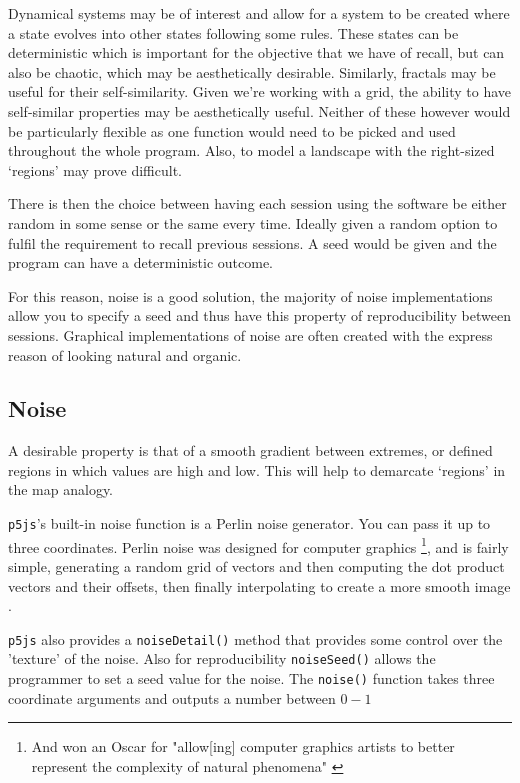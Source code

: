 Dynamical systems may be of interest and allow for a system to be created where
a state evolves into other states following some rules. These states can be
deterministic which is important for the objective that we have of recall, but
can also be chaotic, which may be aesthetically desirable. Similarly, fractals
may be useful for their self-similarity. Given we're working with a grid, the
ability to have self-similar properties may be aesthetically useful. Neither of
these however would be particularly flexible as one function would need to be
picked and used throughout the whole program. Also, to model a landscape with
the right-sized `regions' may prove difficult.

There is then the choice between having each session using the software be
either random in some sense or the same every time. Ideally given a random
option to fulfil the requirement to recall previous sessions. A seed would be
given and the program can have a deterministic outcome.

For this reason, noise is a good solution, the majority of noise implementations
allow you to specify a seed and thus have this property of reproducibility
between sessions. Graphical implementations of noise are often created with the
express reason of looking natural and organic.

\subsection{Noise}
A desirable property is that of a smooth gradient between extremes, or
defined regions in which values are high and low. This will help to demarcate
`regions' in the map analogy. 

\verb|p5js|'s built-in noise function is a Perlin noise generator. You can pass
it up to three coordinates. Perlin noise was designed for computer graphics
\footnote{And won an Oscar for "allow[ing] computer graphics artists to better
represent the complexity of natural phenomena" \citep{nyu_perlin}}, and is
fairly simple, generating a random grid of vectors and then computing the dot
product vectors and their offsets, then finally interpolating to create a more
smooth image \citep{10.1145/566570.566636}.

\verb|p5js| also provides a \verb|noiseDetail()| method that provides some
control over the 'texture' of the noise. Also for reproducibility
\verb|noiseSeed()| allows the programmer to set a seed value for the noise.
The \verb|noise()| function takes three coordinate arguments and outputs a
number between $0-1$


